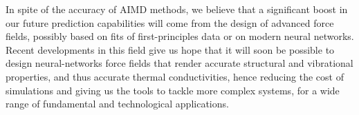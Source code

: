 \smallskip
In spite of the accuracy of AIMD methods, we believe that a significant boost in our future prediction capabilities will come from the design of advanced force fields, possibly based on fits of first-principles data or on modern neural networks. Recent developments in this field give us hope that it will soon be possible to design neural-networks force fields that render accurate structural and vibrational properties, and thus accurate thermal conductivities, hence reducing the cost of simulations and giving us the tools to tackle more complex systems, for a wide range of fundamental and technological applications. 


    
